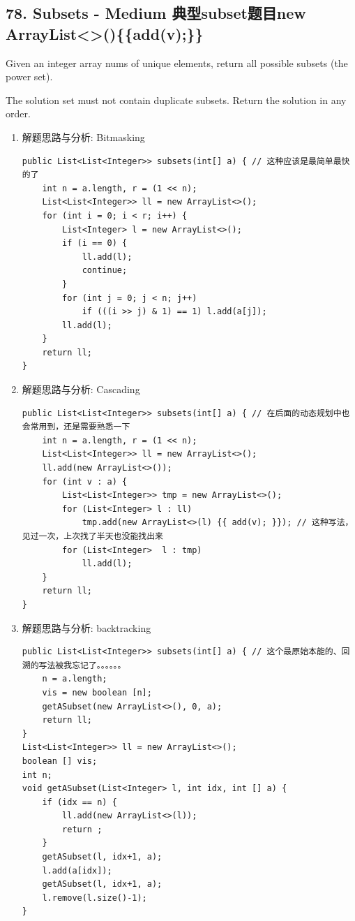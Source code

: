 \documentclass[9pt, b5paaper]{book}
\begin{document}
\subsection{78. Subsets - Medium 典型subset题目new ArrayList<>()\{\{add(v);\}\}}
\label{sec-1-4-17}
Given an integer array nums of unique elements, return all possible subsets (the power set).

The solution set must not contain duplicate subsets. Return the
solution in any order.
\begin{enumerate}
\item 解题思路与分析: Bitmasking
\label{sec-1-4-17-1}
\begin{verbatim}
public List<List<Integer>> subsets(int[] a) { // 这种应该是最简单最快的了
    int n = a.length, r = (1 << n);
    List<List<Integer>> ll = new ArrayList<>();
    for (int i = 0; i < r; i++) {
        List<Integer> l = new ArrayList<>();
        if (i == 0) {
            ll.add(l);
            continue;
        }
        for (int j = 0; j < n; j++) 
            if (((i >> j) & 1) == 1) l.add(a[j]);
        ll.add(l);
    }
    return ll;
}
\end{verbatim}
\item 解题思路与分析: Cascading
\label{sec-1-4-17-2}
\begin{verbatim}
public List<List<Integer>> subsets(int[] a) { // 在后面的动态规划中也会常用到，还是需要熟悉一下
    int n = a.length, r = (1 << n);
    List<List<Integer>> ll = new ArrayList<>();
    ll.add(new ArrayList<>());
    for (int v : a) {
        List<List<Integer>> tmp = new ArrayList<>();
        for (List<Integer> l : ll)
            tmp.add(new ArrayList<>(l) {{ add(v); }}); // 这种写法，见过一次，上次找了半天也没能找出来
        for (List<Integer>  l : tmp) 
            ll.add(l);
    }
    return ll;
}
\end{verbatim}
\item 解题思路与分析: backtracking
\label{sec-1-4-17-3}
\begin{verbatim}
public List<List<Integer>> subsets(int[] a) { // 这个最原始本能的、回溯的写法被我忘记了。。。。。。
    n = a.length;
    vis = new boolean [n];
    getASubset(new ArrayList<>(), 0, a);
    return ll;
}
List<List<Integer>> ll = new ArrayList<>();
boolean [] vis;
int n;
void getASubset(List<Integer> l, int idx, int [] a) {
    if (idx == n) {
        ll.add(new ArrayList<>(l));
        return ;
    }
    getASubset(l, idx+1, a);
    l.add(a[idx]);
    getASubset(l, idx+1, a);
    l.remove(l.size()-1);
}
\end{verbatim}
\end{enumerate}
\end{document}
